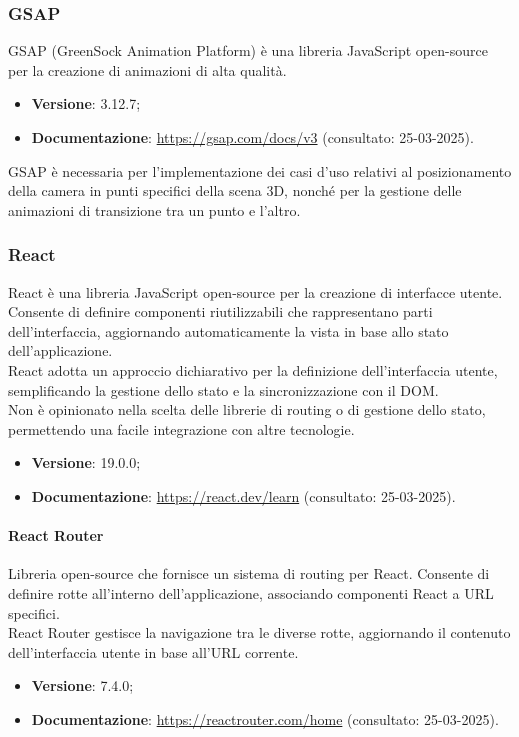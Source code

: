 \subsubsection{GSAP}
GSAP (GreenSock Animation Platform) è una libreria JavaScript open-source per
la creazione di animazioni di alta qualità.
\begin{itemize}
    \item \textbf{Versione}: 3.12.7;
    \item \textbf{Documentazione}: \url{https://gsap.com/docs/v3} (consultato:
          25-03-2025).
\end{itemize}
GSAP è necessaria per l'implementazione dei casi d'uso relativi al posizionamento
della camera in punti specifici della scena 3D, nonché per la gestione delle
animazioni di transizione tra un punto e l'altro.

\subsubsection{React}
React è una libreria JavaScript open-source per la creazione di interfacce
utente. Consente di definire componenti riutilizzabili che rappresentano parti
dell'interfaccia, aggiornando automaticamente la vista in base allo stato
dell'applicazione. \\React adotta un approccio dichiarativo per la definizione
dell'interfaccia utente, semplificando la gestione dello stato e la
sincronizzazione con il DOM. \\Non è opinionato nella scelta delle librerie di
routing o di gestione dello stato, permettendo una facile integrazione con
altre tecnologie.
\begin{itemize}
    \item \textbf{Versione}: 19.0.0;
    \item \textbf{Documentazione}: \url{https://react.dev/learn} (consultato:
          25-03-2025).
\end{itemize}

\paragraph{React Router}
Libreria open-source che fornisce un sistema di routing per React. Consente di
definire rotte all'interno dell'applicazione, associando componenti React a URL
specifici. \\React Router gestisce la navigazione tra le diverse rotte,
aggiornando il contenuto dell'interfaccia utente in base all'URL corrente.
\begin{itemize}
    \item \textbf{Versione}: 7.4.0;
    \item \textbf{Documentazione}: \url{https://reactrouter.com/home} (consultato:
          25-03-2025).
\end{itemize}

